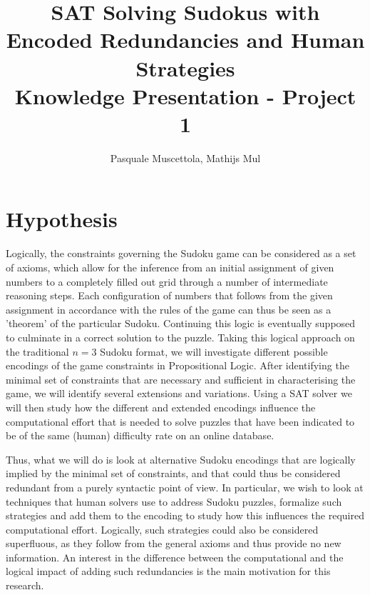 \documentclass[10pt,a4paper,leqno]{article}
\begin{document}
\title{SAT Solving Sudokus with Encoded Redundancies and Human Strategies \\
Knowledge Presentation - Project 1}
\author{Pasquale Muscettola, Mathijs Mul}
\maketitle

\section*{Hypothesis}


Logically, the constraints governing the Sudoku game can be considered as a set of axioms, which allow for the inference from an initial assignment of given numbers to a completely filled out grid through a number of intermediate reasoning steps. Each configuration of numbers that follows from the given assignment in accordance with the rules of the game can thus be seen as a 'theorem' of the particular Sudoku. Continuing this logic is eventually supposed to culminate in a correct solution to the puzzle. Taking this logical approach on the traditional $n = 3$ Sudoku format, we will investigate different possible encodings of the game constraints in Propositional Logic. After identifying the minimal set of constraints that are necessary and sufficient in characterising the game, we will identify several extensions and variations. Using a SAT solver we will then study how the different and extended encodings influence the computational effort that is needed to solve puzzles that have been indicated to be of the same (human) difficulty rate on an online database. 

Thus, what we will do is look at alternative Sudoku encodings that are logically implied by the minimal set of constraints, and that could thus be considered redundant from a purely syntactic point of view. In particular, we wish to look at techniques that human solvers use to address Sudoku puzzles, formalize such strategies and add them to the encoding to study how this influences the required computational effort. Logically, such strategies could also be considered superfluous, as they follow from the general axioms and thus provide no new information. An interest in the difference between the computational and the logical impact of adding such redundancies is the main motivation for this research. 
\end{document}

